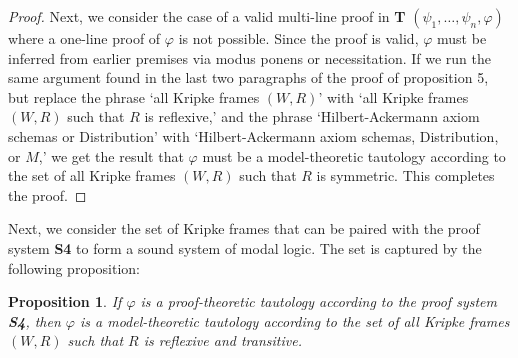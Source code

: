 \documentclass[11pt]{article}
\newtheorem{proposition}[theorem]{Proposition}
\theoremstyle{definition}
\theoremstyle{remark}
\begin{document}
\begin{proof}
Next, we consider the case of a valid multi-line proof in \textbf{T} $(\psi_{1},\dots,\psi_{n},\varphi)$ where a one-line proof of $\varphi$ is not possible. Since the proof is valid, $\varphi$ must be inferred from earlier premises via modus ponens or necessitation. If we run the same argument found in the last two paragraphs of the proof of proposition 5, but replace the phrase `all Kripke frames $(W,R)$' with `all Kripke frames $(W,R)$ such that $R$ is reflexive,' and the phrase `Hilbert-Ackermann axiom schemas or Distribution' with `Hilbert-Ackermann axiom schemas, Distribution, or $M$,' we get the result that $\varphi$ must be a model-theoretic tautology according to the set of all Kripke frames $(W,R)$ such that $R$ is symmetric. This completes the proof.
\end{proof}
\noindent
Next, we consider the set of Kripke frames that can be paired with the proof system \textbf{S4} to form a sound system of modal logic. The set is captured by the following proposition:
\begin{proposition}
    If $\varphi$ is a proof-theoretic tautology according to the proof system \textbf{S4}, then $\varphi$ is a model-theoretic tautology according to the set of all Kripke frames $(W,R)$ such that $R$ is reflexive and transitive.
\end{proposition}
\end{document}
